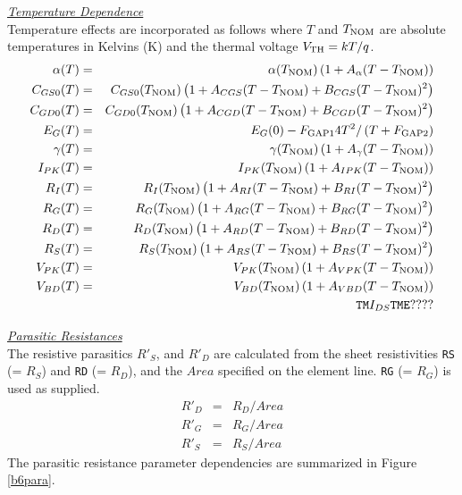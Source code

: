 \noindent\underline{\sl \large Temperature Dependence}
\\[0.1in]
Temperature effects are incorporated as follows where $T$ and $T_{\mbox{\scriptsize NOM}}$
are absolute temperatures in Kelvins (K) and
the thermal voltage $V_{\mbox{\scriptsize TH}} = kT / q$.
\begin{eqnarray}
\alpha(T)   &=& \alpha(T_{\mbox{\scriptsize NOM}})  \left(
                    1 + A_{\alpha} (T-T_{\mbox{\scriptsize NOM}}) \right) \\
C_{GS0}(T)  &=& C_{GS0}(T_{\mbox{\scriptsize NOM}}) \left( 1 +
    A_{CGS} (T-T_{\mbox{\scriptsize NOM}}) + B_{CGS} (T-T_{\mbox{\scriptsize NOM}})^2  \right) \\
C_{GD0}(T)  &=& C_{GD0}(T_{\mbox{\scriptsize NOM}}) \left( 1 +
    A_{CGD} (T-T_{\mbox{\scriptsize NOM}}) + B_{CGD} (T-T_{\mbox{\scriptsize NOM}})^2  \right) \\
E_G(T) & = & E_G(0) -
      F_{\mbox{\scriptsize GAP1}}{{4T^2} / \left( {T+F_{\mbox{\scriptsize GAP2}}} \right) }\\
\gamma(T)   &=& \gamma(T_{\mbox{\scriptsize NOM}})  \left(
                    1 + A_{\gamma} (T-T_{\mbox{\scriptsize NOM}}) \right) \\
I_{PK}(T)   &=& I_{PK}(T_{\mbox{\scriptsize NOM}})  \left(
                    1 + A_{IPK} (T-T_{\mbox{\scriptsize NOM}}) \right) \\
R_I(T)      &=& R_I(T_{\mbox{\scriptsize NOM}})  \left( 1 +
    A_{RI} (T-T_{\mbox{\scriptsize NOM}}) + B_{RI} (T-T_{\mbox{\scriptsize NOM}})^2  \right) \\
R_G(T)      &=& R_G(T_{\mbox{\scriptsize NOM}})  \left( 1 +
    A_{RG} (T-T_{\mbox{\scriptsize NOM}}) + B_{RG} (T-T_{\mbox{\scriptsize NOM}})^2  \right) \\
R_D(T)      &=& R_D(T_{\mbox{\scriptsize NOM}})  \left( 1 +
    A_{RD} (T-T_{\mbox{\scriptsize NOM}}) + B_{RD} (T-T_{\mbox{\scriptsize NOM}})^2  \right) \\
R_S(T)      &=& R_S(T_{\mbox{\scriptsize NOM}})  \left( 1 +
    A_{RS} (T-T_{\mbox{\scriptsize NOM}}) + B_{RS} (T-T_{\mbox{\scriptsize NOM}})^2  \right) \\
V_{PK}(T)   &=& V_{PK}(T_{\mbox{\scriptsize NOM}})  \left(
                    1 + A_{VPK} (T-T_{\mbox{\scriptsize NOM}}) \right) \\
V_{BD}(T)   &=& V_{BD}(T_{\mbox{\scriptsize NOM}})  \left(
                    1 + A_{VBD} (T-T_{\mbox{\scriptsize NOM}}) \right) \\
&&  {\tt TM} I_{DS} {\tt TME}  ????
\end{eqnarray}



\noindent\underline{\sl \large Parasitic Resistances}\\[0.1in]
The resistive parasitics
$R'_S$, and $R'_D$ are calculated from the sheet resistivities
{\tt RS} (= $R_S$) and {\tt RD} (= $R_D$), and the
$Area$ specified on the element line.
{\tt RG} (= $R_G$) is used as supplied.
\begin{eqnarray}
R'_D & = & R_D/Area\\
R'_G & = & R_G/Area\\
R'_S & = & R_S/Area
\end{eqnarray}
The parasitic resistance parameter dependencies are summarized in
Figure \ref{b6para}.

